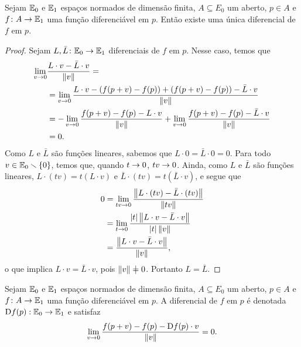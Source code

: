 \begin{proposition}
Sejam $\mathbb{E}_0$ e $\mathbb{E}_1$ espaços normados de dimensão finita, $A \subseteq E_0$ um aberto, $p \in A$ e $f\colon A \to \mathbb{E}_1$ uma função diferenciável em $p$. Então existe uma única diferencial de $f$ em $p$.
\end{proposition}
\begin{proof}
Sejam $L,\bar L\colon \mathbb{E}_0 \to \mathbb{E}_1$ diferenciais de $f$ em $p$. Nesse caso, temos que
	\begin{align*}
	\lim_{v \rightarrow 0} &\frac{L \cdot v - \bar L \cdot v}{\left\Vert{v}\right\Vert} = \\
	&= \lim_{v \rightarrow 0} \frac{L \cdot v - (f(p+v)-f(p)) + (f(p+v)-f(p)) - \bar L \cdot v}{\left\Vert{v}\right\Vert} \\
	& =  -\lim_{v \rightarrow 0} \frac{f(p+v)-f(p) - L \cdot v}{\left\Vert{v}\right\Vert} + \lim_{v \rightarrow 0} \frac{f(p+v)-f(p) - \bar L \cdot v}{\left\Vert{v}\right\Vert} \\
	&=0.
	\end{align*}
Como $L$ e $\bar L$ são funções lineares, sabemos que $L \cdot 0 = \bar L \cdot 0=0$. Para todo $v \in \mathbb{E}_0 \smallsetminus \{0\}$, temos que, quando $t \rightarrow 0$, $tv \rightarrow 0$. Ainda, como $L$ e $\bar L$ são funções lineares, $L \cdot (tv) = t(L \cdot v)$ e $\bar L \cdot (tv) = t (\bar L \cdot v)$, e segue que
	\begin{align*}
	0 &= \lim_{tv \rightarrow 0} \frac{\left\Vert{L \cdot (tv) - \bar L \cdot (tv)}\right\Vert}{\left\Vert{tv}\right\Vert} \\
		&= \lim_{t \rightarrow 0} \frac{\left\vert{t}\right\vert\left\Vert{L \cdot v - \bar L \cdot v}\right\Vert}{\left\vert{t}\right\vert \left\Vert{v}\right\Vert} \\
		&= \frac{\left\Vert{L \cdot v - \bar L \cdot v}\right\Vert}{\left\Vert{v}\right\Vert},
	\end{align*}
o que implica $L \cdot v = \bar L \cdot v$, pois $\nor{v} \neq 0$. Portanto $L=\bar L$.
\end{proof}

\begin{notation}
Sejam $\mathbb{E}_0$ e $\mathbb{E}_1$ espaços normados de dimensão finita, $A \subseteq E_0$ um aberto, $p \in A$ e $f\colon A \to \mathbb{E}_1$ uma função diferenciável em $p$. A diferencial de $f$ em $p$ é denotada $\mathrm{D} f(p): \mathbb{E}_0 \to \mathbb{E}_1$ e satisfaz
	\begin{equation*}
	\lim_{v \rightarrow 0} \frac{f(p+v) - f(p) - \mathrm{D} f(p) \cdot v}{\left\Vert{v}\right\Vert} = 0.
	\end{equation*}
\end{notation}

